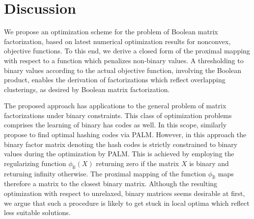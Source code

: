 \section{Discussion}
We propose an optimization scheme for the problem of Boolean matrix factorization, based on latest numerical optimization results for nonconvex, objective functions. To this end, we derive a closed form of the proximal mapping with respect to a function which penalizes non-binary values. A thresholding to binary values according to the actual objective function, involving the Boolean product, enables the derivation of factorizations which reflect overlapping clusterings, as desired by Boolean matrix factorization.

The proposed approach has applications to the general problem of matrix factorizations under binary constraints. This class of optimization problems comprises the learning of binary has codes as well. In this scope, \cite{shen2016fast} similarly propose to find optimal hashing codes via PALM. However, in this approach the binary factor matrix denoting the hash codes is strictly constrained to binary values during the optimization by PALM. This is achieved by employing the regularizing function $\phi_\mathbb{B}(X)$ returning zero if the matrix $X$ is binary and returning infinity otherwise. The proximal mapping of the function $\phi_\mathbb{B}$ maps therefore a matrix to the closest binary matrix. Although the resulting optimization with respect to unrelaxed, binary matrices seems desirable at first, we argue that such a procedure is likely to get stuck in local optima which reflect less suitable solutions.  